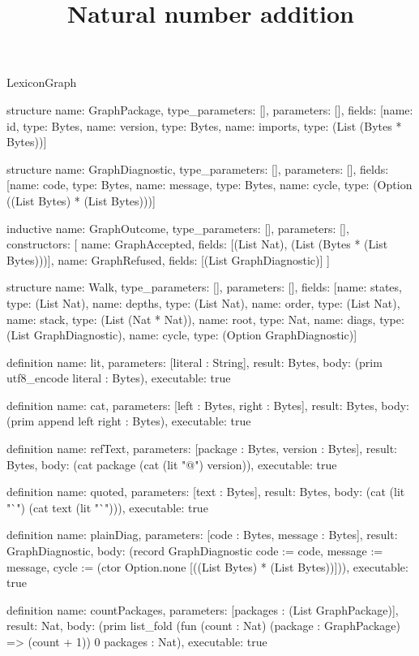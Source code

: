 \begin{lexlean}{LexiconGraph}
\title{Natural number addition}
\begin{semanticmodule}
structure{
  name: GraphPackage,
  type_parameters: [],
  parameters: [],
  fields: [{name: id, type: Bytes}, {name: version, type: Bytes}, {name: imports, type: (List (Bytes * Bytes))}]
}

structure{
  name: GraphDiagnostic,
  type_parameters: [],
  parameters: [],
  fields: [{name: code, type: Bytes}, {name: message, type: Bytes}, {name: cycle, type: (Option ((List Bytes) * (List Bytes)))}]
}

inductive{
  name: GraphOutcome,
  type_parameters: [],
  parameters: [],
  constructors: [
    {name: GraphAccepted, fields: [(List Nat), (List (Bytes * (List Bytes)))]},
    {name: GraphRefused, fields: [(List GraphDiagnostic)]}
  ]
}

structure{
  name: Walk,
  type_parameters: [],
  parameters: [],
  fields: [{name: states, type: (List Nat)}, {name: depths, type: (List Nat)}, {name: order, type: (List Nat)}, {name: stack, type: (List (Nat * Nat))}, {name: root, type: Nat}, {name: diags, type: (List GraphDiagnostic)}, {name: cycle, type: (Option GraphDiagnostic)}]
}

definition{
  name: lit,
  parameters: [literal : String],
  result: Bytes,
  body: (prim utf8_encode literal : Bytes),
  executable: true
}

definition{
  name: cat,
  parameters: [left : Bytes, right : Bytes],
  result: Bytes,
  body: (prim append left right : Bytes),
  executable: true
}

definition{
  name: refText,
  parameters: [package : Bytes, version : Bytes],
  result: Bytes,
  body: (cat package (cat (lit "@") version)),
  executable: true
}

definition{
  name: quoted,
  parameters: [text : Bytes],
  result: Bytes,
  body: (cat (lit "`") (cat text (lit "`"))),
  executable: true
}

definition{
  name: plainDiag,
  parameters: [code : Bytes, message : Bytes],
  result: GraphDiagnostic,
  body: (record GraphDiagnostic {code := code, message := message, cycle := (ctor Option.none [((List Bytes) * (List Bytes))])}),
  executable: true
}

definition{
  name: countPackages,
  parameters: [packages : (List GraphPackage)],
  result: Nat,
  body: (prim list_fold (fun (count : Nat) (package : GraphPackage) => (count + 1)) 0 packages : Nat),
  executable: true
}


\end{semanticmodule}
\end{lexlean}
